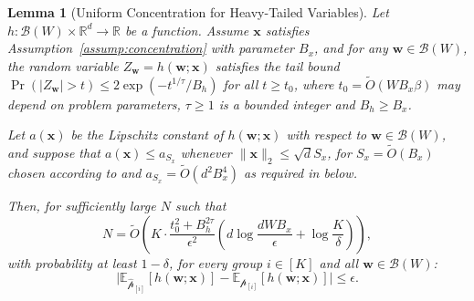 \documentclass[11pt]{article}
\newcounter{thm}
\numberwithin{thm}{section}
\theoremstyle{plain}
\newtheorem{lemma}[thm]{Lemma}
\theoremstyle{definition}
\theoremstyle{remark} \newtheorem{remark}[thm]{Remark}
\def\vw{{\bm{w}}}
\def\vx{{\bm{x}}}
\def\ep{\widehat{\mathcal{p}}}
\def\pp{{\mathcal{p}}}
\def\cB{{\mathcal{B}}}
\newcommand{\E}{\mathbb{E}}
\newcommand{\R}{\mathbb{R}}
\newcommand{\ppi}{{\pp_{[i]}}}
\newcommand{\epi}{\ep_{[i]}}
\begin{document}
\begin{lemma}[Uniform Concentration for Heavy-Tailed Variables]
\label{lemma:uniform_concentration_heavy_tailed}
    Let $h:\cB(W)\times\R^d\to\R$ be a function. 
	Assume $\vx$ satisfies Assumption~\ref{assump:concentration} with parameter $B_x$,
	and for any $\vw \in \cB(W)$, the random variable $Z_\vw = h(\vw; \vx)$ 
	satisfies the tail bound $\Pr(|Z_\vw| > t) \le 2\exp(-t^{1/\tau}/B_h)$ for all $t \ge t_0$, 
	where $t_0 = \tilde{O}(WB_x\beta)$ may depend on problem parameters, $\tau \ge 1$ is a bounded integer and $B_h \ge B_x$.
    
    Let $a(\vx)$ be the Lipschitz constant of $h(\vw; \vx)$ with respect to $\vw \in \cB(W)$,
    and suppose that $a(\vx) \leq a_{S_x}$ whenever $\|\vx\|_2 \le \sqrt{d}S_x$, for $S_x = \tilde{O}(B_x)$ chosen according to  and $a_{S_x} = \tilde O(d^2B_x^4)$ as required in  below.
    
    Then, for sufficiently large $N$ such that 
      \[
    N = \tilde{O}\left( K \cdot \frac{t_0^2 + B_h^{2\tau}}{\epsilon^2} \left(d\log\frac{dW B_x}{\epsilon} + \log\frac{K}{\delta}\right) \right),
    \]
    with probability at least $1-\delta$, for every group $i\in[K]$ and all $\vw\in\cB(W)$:
    \[
    \bigl|\E_{\epi}[h(\vw;\vx)]-\E_{\ppi}[h(\vw;\vx)]\bigr|\le 
    \epsilon.
    \]
\end{lemma}
\end{document}
